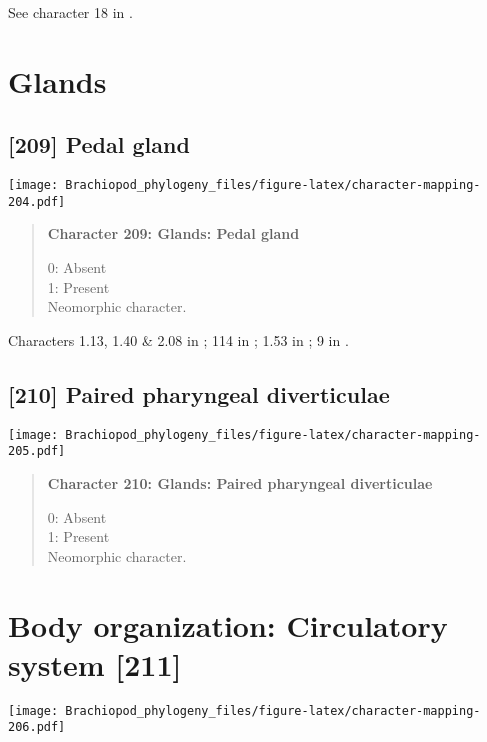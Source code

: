 \documentclass[openany]{book}
\theoremstyle{definition}
\theoremstyle{definition}
\theoremstyle{definition}
\theoremstyle{remark}
\begin{document}
See character 18 in \citet{Haszprunar1996}.

\section{Glands}\label{glands-1}

\subsection*{{[}209{]} Pedal gland}\label{pedal-gland-1}

\texttt{[image: Brachiopod\_phylogeny\_files/figure-latex/character-mapping-204.pdf]}

\begin{quote}
\textbf{Character 209: Glands: Pedal gland}

0: Absent\\
1: Present\\
Neomorphic character.
\end{quote}

Characters 1.13, 1.40 \& 2.08 in \citet{Scheltema1993}; 114 in
\citet{Giribet2002}; 1.53 in \citet{SPS1996}; 9 in
\citet{Haszprunar1996}.

\subsection*{{[}210{]} Paired pharyngeal
diverticulae}\label{paired-pharyngeal-diverticulae}

\texttt{[image: Brachiopod\_phylogeny\_files/figure-latex/character-mapping-205.pdf]}

\begin{quote}
\textbf{Character 210: Glands: Paired pharyngeal diverticulae}

0: Absent\\
1: Present\\
Neomorphic character.
\end{quote}

\section{Body organization: Circulatory system
{[}211{]}}\label{body-organization-circulatory-system-211}

\texttt{[image: Brachiopod\_phylogeny\_files/figure-latex/character-mapping-206.pdf]}
\end{document}
